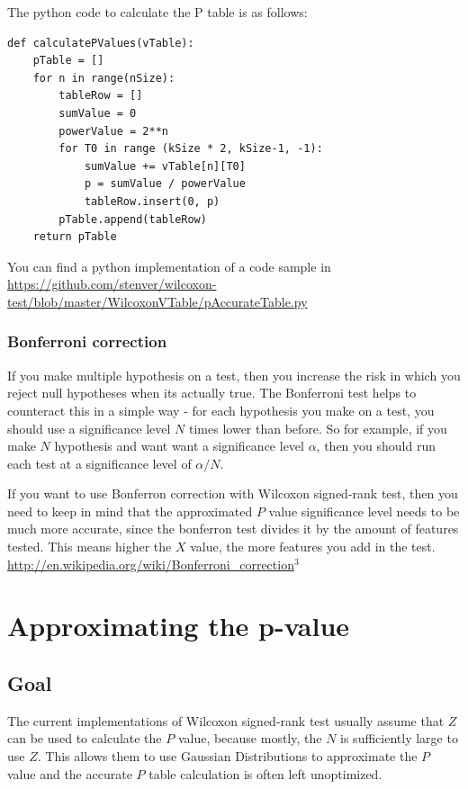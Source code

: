 \documentclass[12pt]{article}
\begin{document}
The python code to calculate the P table is as follows:

\begin{verbatim}
def calculatePValues(vTable):
    pTable = []
    for n in range(nSize):
        tableRow = []
        sumValue = 0
        powerValue = 2**n
        for T0 in range (kSize * 2, kSize-1, -1):
            sumValue += vTable[n][T0]
            p = sumValue / powerValue
            tableRow.insert(0, p)
        pTable.append(tableRow)
    return pTable

\end{verbatim}

You can find a python implementation of a code sample in
\url{https://github.com/stenver/wilcoxon-test/blob/master/WilcoxonVTable/pAccurateTable.py}

\subsubsection{Bonferroni correction}

If you make multiple hypothesis on a test, then you increase the risk in which you reject null hypotheses when its actually true. The Bonferroni test helps to counteract this in a simple way - for each hypothesis you make on a test, you should use a significance level $N$ times lower than before. So for example, if you make $N$ hypothesis and want want a significance level $α$,  then you should run each test at a significance level of $α/N$.

If you want to use Bonferron correction with Wilcoxon signed-rank test, then you need to keep in mind that the approximated $P$ value significance level needs to be much more accurate, since the bonferron test divides it by the amount of features tested. This means higher the $X$ value, the more features you add in the test. \url{http://en.wikipedia.org/wiki/Bonferroni_correction}$^3$

\newpage

\section{Approximating the p-value}

\subsection{Goal}
The current implementations of Wilcoxon signed-rank test usually assume that $Z$ can be used to calculate the $P$ value, because mostly, the $N$ is sufficiently large to use $Z$.
This allows them to use Gaussian Distributions to approximate the $P$ value and the accurate $P$ table calculation is often left unoptimized.
\end{document}
